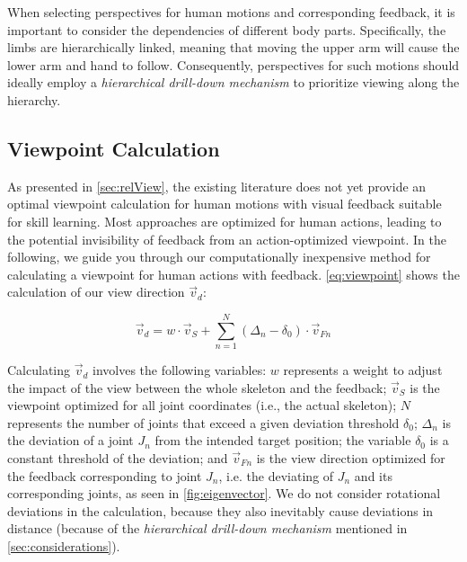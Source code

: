 When selecting perspectives for human motions and corresponding feedback, it is important to consider the dependencies of different body parts. Specifically, the limbs are hierarchically linked, meaning that moving the upper arm will cause the lower arm and hand to follow. Consequently, perspectives for such motions should ideally employ a \emph{hierarchical drill-down mechanism} to prioritize viewing along the hierarchy.

\subsection{Viewpoint Calculation \label{sec:methViewCalc}}

As presented in \autoref{sec:relView}, the existing literature does not yet provide an optimal viewpoint calculation for human motions with visual feedback suitable for skill learning. Most approaches are optimized for human actions, leading to the potential invisibility of feedback from an action-optimized viewpoint. In the following, we guide you through our computationally inexpensive method for calculating a viewpoint for human actions with feedback. \autoref{eq:viewpoint} shows the calculation of our view direction $\vec{v}_d$:

\begin{equation}
	\label{eq:viewpoint}
	\vec{v}_d = w \cdot \vec{v}_{S} + \sum_{n=1}^N (\Delta_n - \delta_0) \cdot \vec{v}_{Fn}
\end{equation}

Calculating $\vec{v}_d$ involves the following variables: \(w\) represents a weight to adjust the impact of the view between the whole skeleton and the feedback; \(\vec{v}_S\) is the viewpoint optimized for all joint coordinates (i.e., the actual skeleton); \(N\) represents the number of joints that exceed a given deviation threshold \(\delta_0\); \(\Delta_n\) is the deviation of a joint \(J_n\) from the intended target position; the variable \(\delta_0\) is a constant threshold of the deviation; and \(\vec{v}_{Fn}\) is the view direction optimized for the feedback corresponding to joint \(J_n\), i.e. the deviating of \(J_n\) and its corresponding joints, as seen in \autoref{fig:eigenvector}. We do not consider rotational deviations in the calculation, because they also inevitably cause deviations in distance (because of the \emph{hierarchical drill-down mechanism} mentioned in \autoref{sec:considerations}).

